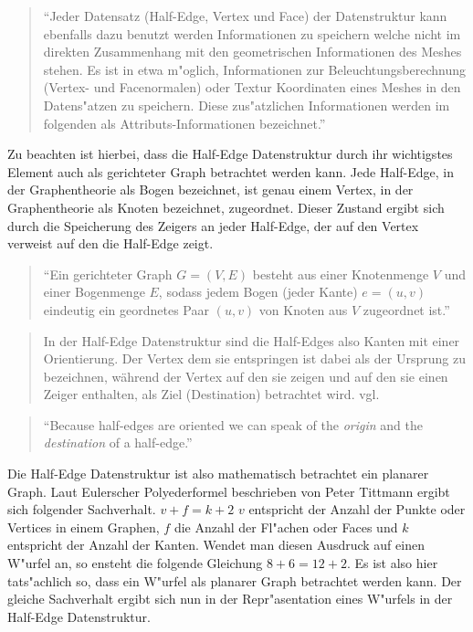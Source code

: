 \documentclass[pagesize, paper=a4, fontsize=12pt,titlepage=true, headings=small, headnosepline, abstractoff, liststotoc, nochapterprefix, plainheadsepline]{scrreprt}
\newcommand{\HES}{Half-Edge Datenstruktur }
\begin{document}
\begin{quote}"`Jeder Datensatz (Half-Edge, Vertex und Face) der Datenstruktur kann ebenfalls dazu benutzt werden Informationen zu speichern welche nicht im direkten Zusammenhang mit den geometrischen Informationen des Meshes stehen. Es ist in etwa m"oglich, Informationen zur Beleuchtungsberechnung (Vertex- und Facenormalen) oder Textur Koordinaten eines Meshes in den Datens"atzen zu speichern. Diese zus"atzlichen Informationen werden im folgenden als Attributs-Informationen bezeichnet."' \cite[S.~31]{vanMarkdeBerg.2008}\end{quote}

Zu beachten ist hierbei, dass die \HES durch ihr wichtigstes Element auch als gerichteter Graph betrachtet werden kann. Jede Half-Edge, in der Graphentheorie als Bogen bezeichnet, ist genau einem Vertex, in der Graphentheorie als Knoten bezeichnet, zugeordnet. Dieser Zustand ergibt sich durch die Speicherung des Zeigers an jeder Half-Edge, der auf den Vertex verweist auf den die Half-Edge zeigt.
\begin{quote}"`Ein gerichteter Graph \(G = (V,E)\) besteht aus einer Knotenmenge \(V\) und einer Bogenmenge \(E\), sodass jedem Bogen (jeder Kante) \(e = (u,v)\) eindeutig ein geordnetes Paar \((u,v)\) von Knoten aus \(V\) zugeordnet ist."' \cite[S.~127]{Tittmann.2011}\end{quote}

\begin{quote}In der Half-Edge Datenstruktur sind die Half-Edges also Kanten mit einer Orientierung. Der Vertex dem sie entspringen ist dabei als der Ursprung zu bezeichnen, w{\"a}hrend der Vertex auf den sie zeigen und auf den sie einen Zeiger enthalten, als Ziel (Destination) betrachtet wird. vgl.\cite[S.~31]{vanMarkdeBerg.2008}\end{quote}

\begin{quote}"`Because half-edges are oriented we can speak of the \textit{origin }and the \textit{destination }of a half-edge."' \cite[S.~31]{vanMarkdeBerg.2008}\end{quote}

Die \HES ist also mathematisch betrachtet ein planarer Graph. Laut Eulerscher Polyederformel beschrieben von Peter Tittmann \cite[S.~47--50]{Tittmann.2011} ergibt sich folgender Sachverhalt. \(v + f = k + 2\) \(v\) entspricht der Anzahl der Punkte oder Vertices in einem Graphen, \(f\) die Anzahl der Fl"achen oder Faces und \(k\) entspricht der Anzahl der Kanten. Wendet man diesen Ausdruck auf einen W"urfel an, so ensteht die folgende Gleichung \(8 + 6 = 12 + 2\). Es ist also hier tats"achlich so, dass ein W"urfel als planarer Graph betrachtet werden kann. Der gleiche Sachverhalt ergibt sich nun in der Repr"asentation eines W"urfels in der Half-Edge Datenstruktur.
\end{document}
